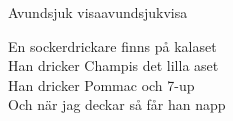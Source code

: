 \begin{song}{Avundsjuk visa}{avundsjukvisa}
\begin{vers}
En sockerdrickare finns på kalaset\\
Han dricker Champis det lilla aset\\
Han dricker Pommac och 7-up\\
Och när jag deckar så får han napp\\
\end{vers}
\end{song}
